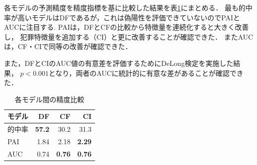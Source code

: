


各モデルの予測精度を精度指標を基に比較した結果を表\ref{tb:fig:non-crime-timeseries-index}にまとめる．
最も的中率が高いモデルはDFであるが，これは偽陽性を評価できていないのでPAIとAUCに注目する.
PAIは，DFとCFの比較から特徴量を連続化すると大きく改善し，
犯罪特徴量を追加する（CI）と更に改善することが確認できた．
またAUCは，CF・CIで同等の改善が確認できた．

また，DFとCIのAUC値の有意差を評価するためにDeLong検定\cite{DeLong}を実施した結果，
$p<0.001$となり，両者のAUCに統計的に有意な差があることが確認できた．

\begin{table}[htbp]
  \centering
  \caption{各モデル間の精度比較}
  \begin{tabular}{l|r||r|r}
  \hline

  モデル & DF & CF & CI \\  \hline\hline
  的中率 & \bf{57.2} & 30.2 & 31.3  \\ 
  PAI & 1.84 & 2.18 & \bf{2.29} \\ 
  AUC & 0.74 & \bf{0.76} & \bf{0.76} \\ \hline
  


  \end{tabular}
  \label{tb:fig:non-crime-timeseries-index}
\end{table}

\FloatBarrier